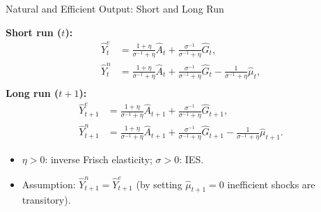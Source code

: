\documentclass[11pt,aspectratio=169]{beamer}
\begin{document}
\begin{frame}{Natural and Efficient Output: Short and Long Run}
\small

\textbf{Short run ($t$):}
\begin{align}
\hat{Y}^{e}_{t} &= \frac{1+\eta}{\sigma^{-1}+\eta} \hat{A}_t
                 + \frac{\sigma^{-1}}{\sigma^{-1}+\eta} \hat{G}_t, \label{Efficient1} \\
\hat{Y}^{n}_{t} &= \frac{1+\eta}{\sigma^{-1}+\eta} \hat{A}_t
                 + \frac{\sigma^{-1}}{\sigma^{-1}+\eta} \hat{G}_t
                 - \frac{1}{\sigma^{-1}+\eta} \hat{\mu}_t, \label{Natural1} \\
\end{align}
\textbf{Long run ($t+1$):}
\begin{align}
\hat{Y}^{e}_{t+1} &= \frac{1+\eta}{\sigma^{-1}+\eta} \hat{A}_{t+1}
                   + \frac{\sigma^{-1}}{\sigma^{-1}+\eta} \hat{G}_{t+1}, \label{Efficient2} \\
\hat{Y}^{n}_{t+1} &= \frac{1+\eta}{\sigma^{-1}+\eta} \hat{A}_{t+1}
                   + \frac{\sigma^{-1}}{\sigma^{-1}+\eta} \hat{G}_{t+1}
                   - \frac{1}{\sigma^{-1}+\eta} \hat{\mu}_{t+1}. \label{Natural2}
\end{align}

\vspace{0cm} %

\begin{itemize}
    \item $\eta > 0$: inverse Frisch elasticity; $\sigma > 0$: IES.
    \item Assumption: $\hat{Y}^{n}_{t+1} = \hat{Y}^{e}_{t+1}$ (by setting $\hat{\mu}_{t+1} = 0$ inefficient shocks are transitory).
\end{itemize}

\end{frame}
\end{document}
